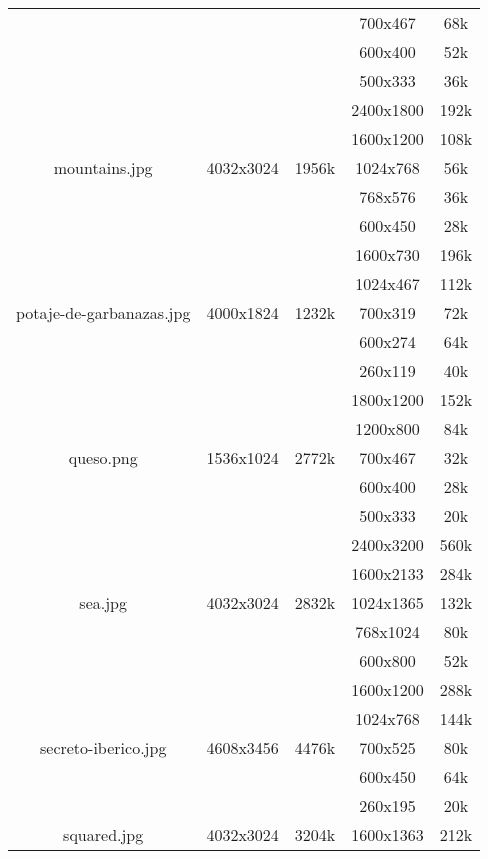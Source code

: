 \documentclass{article}
\begin{document}
\begin{longtable}{c|c|c|c|c}
     &  &  & 700x467 & 68k \\
     &  &  & 600x400 & 52k \\
     &  &  & 500x333 & 36k \\
    \hline
    \multirow{5}{*}{mountains.jpg} & \multirow{5}{*}{4032x3024} & \multirow{5}{*}{1956k} & 2400x1800 & 192k \\
     &  &  & 1600x1200 & 108k \\
     &  &  & 1024x768 & 56k \\
     &  &  & 768x576 & 36k \\
     &  &  & 600x450 & 28k \\
    \hline
    \multirow{5}{*}{potaje-de-garbanazas.jpg} & \multirow{5}{*}{4000x1824} & \multirow{5}{*}{1232k} & 1600x730 & 196k \\
     &  &  & 1024x467 & 112k \\
     &  &  & 700x319 & 72k \\
     &  &  & 600x274 & 64k \\
     &  &  & 260x119 & 40k \\
    \hline
    \multirow{5}{*}{queso.png} & \multirow{5}{*}{1536x1024} & \multirow{5}{*}{2772k} & 1800x1200 & 152k \\
     &  &  & 1200x800 & 84k \\
     &  &  & 700x467 & 32k \\
     &  &  & 600x400 & 28k \\
     &  &  & 500x333 & 20k \\
    \hline
    \multirow{5}{*}{sea.jpg} & \multirow{5}{*}{4032x3024} & \multirow{5}{*}{2832k} & 2400x3200 & 560k \\
     &  &  & 1600x2133 & 284k \\
     &  &  & 1024x1365 & 132k \\
     &  &  & 768x1024 & 80k \\
     &  &  & 600x800 & 52k \\
    \hline
    \multirow{5}{*}{secreto-iberico.jpg} & \multirow{5}{*}{4608x3456} & \multirow{5}{*}{4476k} & 1600x1200 & 288k \\
     &  &  & 1024x768 & 144k \\
     &  &  & 700x525 & 80k \\
     &  &  & 600x450 & 64k \\
     &  &  & 260x195 & 20k \\
    \hline
    \multirow{4}{*}{squared.jpg} & \multirow{4}{*}{4032x3024} & \multirow{4}{*}{3204k} & 1600x1363 & 212k \\

\end{longtable}
\end{document}
